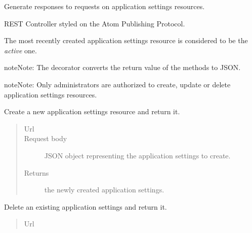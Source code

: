 \documentclass[letterpaper,10pt,english]{sphinxmanual}
\begin{document}
\begin{fulllineitems}
\label{api:onlinelinguisticdatabase.controllers.applicationsettings.ApplicationsettingsController}
Generate responses to requests on application settings resources.

REST Controller styled on the Atom Publishing Protocol.

The most recently created application settings resource is considered to be
the \emph{active} one.

\begin{notice}{note}{Note:}
The  decorator converts the return value of the methods to
JSON.
\end{notice}

\begin{notice}{note}{Note:}
Only administrators are authorized to create, update or delete
application settings resources.
\end{notice}

\begin{fulllineitems}
\label{api:onlinelinguisticdatabase.controllers.applicationsettings.ApplicationsettingsController.create}
Create a new application settings resource and return it.
\begin{quote}\begin{description}
\item[{Url }] \leavevmode
{}

\item[{Request body}] \leavevmode
JSON object representing the application settings to create.

\item[{Returns}] \leavevmode
the newly created application settings.

\end{description}\end{quote}

\end{fulllineitems}


\begin{fulllineitems}
\label{api:onlinelinguisticdatabase.controllers.applicationsettings.ApplicationsettingsController.delete}
Delete an existing application settings and return it.
\begin{quote}\begin{description}
\item[{Url }] \leavevmode
{}


\end{description}
\end{quote}
\end{fulllineitems}
\end{fulllineitems}
\end{document}
